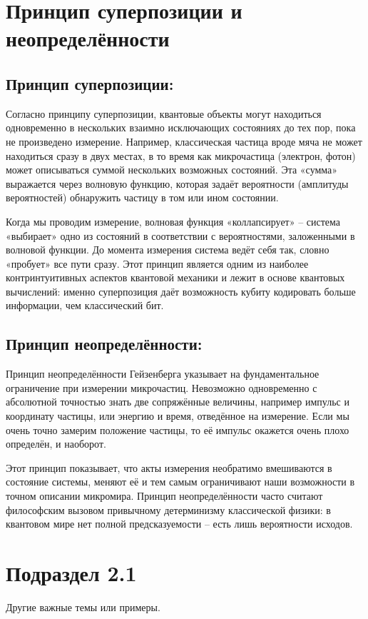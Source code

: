 \documentclass[a4paper,12pt]{article}
\begin{document}
\section{Принцип суперпозиции и неопределённости}
\subsection{\textbf{Принцип суперпозиции:}} Согласно принципу суперпозиции, квантовые объекты могут находиться одновременно в нескольких взаимно исключающих
состояниях до тех пор, пока не произведено измерение. Например, классическая частица вроде мяча не может находиться сразу в двух местах, в то время как
микрочастица (электрон, фотон) может описываться суммой нескольких возможных состояний. Эта «сумма» выражается через волновую функцию, которая задаёт
вероятности (амплитуды вероятностей) обнаружить частицу в том или ином состоянии.

Когда мы проводим измерение, волновая функция «коллапсирует» – система «выбирает» одно из состояний в соответствии с вероятностями, заложенными в волновой
функции. До момента измерения система ведёт себя так, словно «пробует» все пути сразу. Этот принцип является одним из наиболее контринтуитивных аспектов
квантовой механики и лежит в основе квантовых вычислений: именно суперпозиция даёт возможность кубиту кодировать больше информации, чем классический бит.

\subsection{\textbf{Принцип  неопределённости:}} Принцип неопределённости Гейзенберга указывает на фундаментальное ограничение при измерении микрочастиц.
Невозможно одновременно с абсолютной точностью знать две сопряжённые величины, например импульс и координату частицы, или энергию и время, отведённое на
измерение. Если мы очень точно замерим положение частицы, то её импульс окажется очень плохо определён, и наоборот.

Этот принцип показывает, что акты измерения необратимо вмешиваются в состояние системы, меняют её и тем самым ограничивают наши возможности в точном
описании микромира. Принцип неопределённости часто считают философским вызовом привычному детерминизму классической физики: в квантовом мире нет полной
предсказуемости – есть лишь вероятности исходов.



\section{Подраздел 2.1}
Другие важные темы или примеры.
\end{document}
